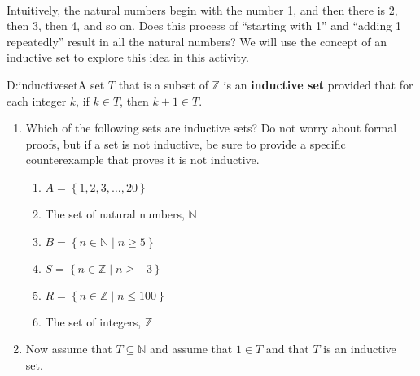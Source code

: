 \begin{previewactivity} \label{PA:propertyofN} \hfill \\
Intuitively, the natural numbers begin with the number  1, and then there is 2, then 3, then 4, and so on.  Does this process of ``starting with 1'' and ``adding 1 repeatedly'' result in all the natural numbers?  We will use the concept of an inductive set to explore this idea in this activity.

\begin{defbox}{D:inductiveset}{A set  $T$  that is a subset of  $\mathbb{Z}$ is an 
\textbf{inductive set}
%
 provided that for each integer $k$, if $k \in T$, then  $k + 1 \in T$.}
\end{defbox}


\begin{enumerate}
\item Which of the following sets are inductive sets?  Do not worry about formal proofs, but if a set is  not inductive, be sure to provide a specific counterexample that proves it is not inductive.

\begin{multicols}{2}
\begin{enumerate}
\item $A = \left\{ {1,2,3, \ldots ,20} \right\}$

\item The set of natural numbers, $\mathbb{N}$

\item $B = \left\{ { {n \in \mathbb{N}} \mid n \geq 5} \right\}$
 
\item $S = \left\{ { {n \in \mathbb{Z}} \mid n \geq  - 3} \right\}$
 
\item $R = \left\{ { {n \in \mathbb{Z}} \mid n \leq  100} \right\}$

\item The set of integers, $\mathbb{Z}$
\end{enumerate}
\end{multicols}

\item Now assume that  $T \subseteq \mathbb{N}$ and assume that  $1 \in T$ and that  $T$ is an inductive set. \label{PA:propertyofN6}


\end{enumerate}
\end{previewactivity}
